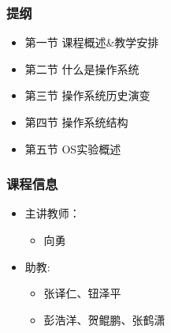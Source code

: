 %
%
\begin{frame}
    \frametitle{提纲}
    \begin{itemize}
        \item 第一节 课程概述&教学安排
        \item 第二节 什么是操作系统
        \item 第三节 操作系统历史演变
        \item 第四节 操作系统结构
        \item 第五节 OS实验概述
    \end{itemize}
\end{frame}
\begin{frame}
    \frametitle{课程信息}
    \begin{itemize}
        \item 主讲教师：
        \begin{itemize}
            \item 向勇
        \end{itemize}
        
        \item 助教: 
        \begin{itemize}
            \item 张译仁、钮泽平
            \item 彭浩洋、贺鲲鹏、张鹤潇
        \end{itemize}
    \end{itemize}
\end{frame}


